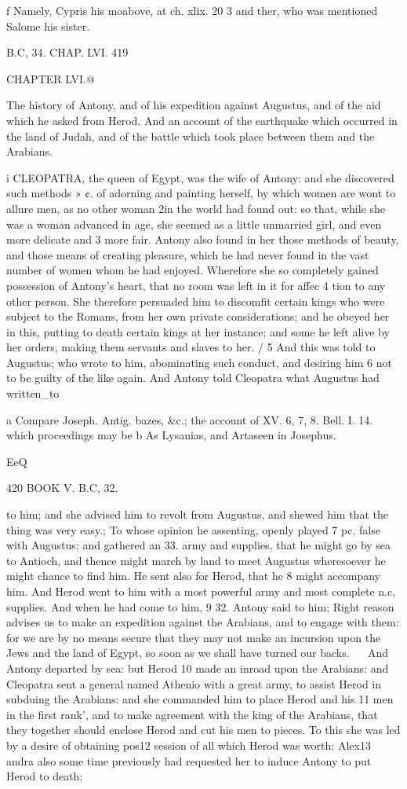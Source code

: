f Namely, Cypris his moabove, at ch. xlix. 20 3 and ther, who was mentioned Salome his sister. 

B.C, 34. CHAP. LVI. 419 

CHAPTER LVI.@ 

The history of Antony, and of his expedition against Augustus, and of the aid which he asked from Herod. And an account of the earthquake which occurred in the land of Judah, and of the battle which took place between them and the Arabians. 

i CLEOPATRA, the queen of Egypt, was the wife of Antony: and she discovered such methods » ¢. of adorning and painting herself, by which women are wont to allure men, as no other woman 
2in the world had found out: so that, while she was a woman advanced in age, she seemed as a little unmarried girl, and even more delicate and 
3 more fair. Antony also found in her those methods of beauty, and those means of creating pleasure, which he had never found in the vast number of women whom he had enjoyed. Wherefore she so completely gained possession of Antony’s heart, that no room was left in it for affec
4 tion to any other person. She therefore persuaded him to discomfit certain kings who were subject to the Romans, from her own private considerations; and he obeyed her in this, putting to death certain kings at her instance; and some he left alive by her orders, making them servants and slaves to her. / 
5 And this was told to Augustus; who wrote to him, abominating such conduct, and desiring him 
6 not to be guilty of the like again. And Antony told Cleopatra what Augustus had written_to 

a Compare Joseph. Antig. bazes, &c.; the account of XV. 6, 7, 8. Bell. I. 14. which proceedings may be b As Lysanias, and Artaseen in Josephus. 

EeQ 

420 BOOK V. B.C, 32. 

to him; and she advised him to revolt from Augustus, and shewed him that the thing was very easy.; To whose opinion he assenting, openly played 7 pc, false with Augustus; and gathered an 33. army and supplies, that he might go by sea to Antioch, and thence might march by land to meet Augustus wheresoever he might chance to find him. He sent also for Herod, that he 8 might accompany him. And Herod went to him with a most powerful army and most complete n.c, supplies. And when he had come to him, 9 32. Antony said to him; Right reason advises us to make an expedition against the Arabians, and to engage with them: for we are by no means secure that they may not make an incursion upon the Jews and the land of Egypt, so soon as we shall have turned our backs. ~~ And Antony departed by sea: but Herod 10 made an inroad upon the Arabians: and Cleopatra sent a general named Athenio with a great army, to assist Herod in subduing the Arabians: and she commanded him to place Herod and his 11 men in the first rank’, and to make agreement with the king of the Arabians, that they together should enclose Herod and cut his men to pieces. To this she was led by a desire of obtaining pos12 session of all which Herod was worth: Alex13 andra also some time previously had requested her to induce Antony to put Herod to death; 




